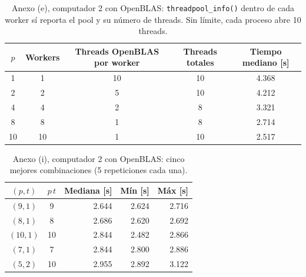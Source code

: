
\begin{table}[H]
    \centering
    \small
    \begin{tabular}{|c|c|c|c|c|}
    \hline
    $p$ & \textbf{Workers} & \textbf{Threads OpenBLAS por worker} & \textbf{Threads totales} & \textbf{Tiempo mediano [s]} \\
    \hline
    1 & 1 & 10 & 10 & 4.368 \\
    2 & 2 & 5 & 10 & 4.212 \\
    4 & 4 & 2 & 8 & 3.321 \\
    8 & 8 & 1 & 8 & 2.714 \\
    10 & 10 & 1 & 10 & 2.517 \\
    \hline
    \end{tabular}
    \caption{Anexo (e), computador 2 con OpenBLAS: \texttt{threadpool\_info()} dentro de cada worker sí reporta el pool y su número de threads. Sin límite, cada proceso abre 10 threads.}
    \label{tab:anexo-e-openblas}
\end{table}

\begin{table}[H]
    \centering
    \small
    \begin{tabular}{|c|c|r|r|r|}
    \hline
    \textbf{$(p,t)$} & $p\,t$ & \textbf{Mediana [s]} & \textbf{Mín [s]} & \textbf{Máx [s]} \\
    \hline
    $(9,1)$ & 9 & 2.644 & 2.624 & 2.716 \\
    $(8,1)$ & 8 & 2.686 & 2.620 & 2.692 \\
    $(10,1)$ & 10 & 2.844 & 2.482 & 2.866 \\
    $(7,1)$ & 7 & 2.844 & 2.800 & 2.886 \\
    $(5,2)$ & 10 & 2.955 & 2.892 & 3.122 \\
    \hline
    \end{tabular}
    \caption{Anexo (i), computador 2 con OpenBLAS: cinco mejores combinaciones (5 repeticiones cada una).}
    \label{tab:anexo-i-top}
\end{table}

